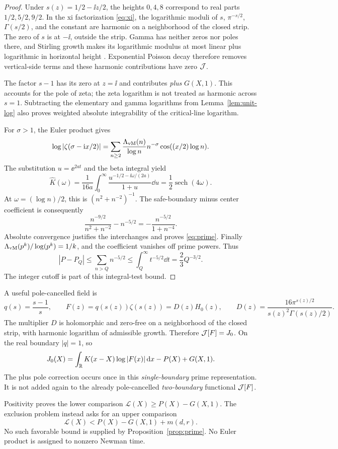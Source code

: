 \begin{proof}
Under \(s(z)=1/2-\ii z/2\), the heights \(0,4,8\) correspond to
real parts \(1/2,5/2,9/2\). In the xi factorization
\eqref{eq:xi}, the logarithmic moduli of \(s\), \(\pi^{-s/2}\),
\(\Gamma(s/2)\), and the constant are harmonic on a neighborhood
of the closed strip. The zero of \(s\) is at \(-\ii\), outside
the strip. Gamma has neither zeros nor poles there, and Stirling
growth makes its logarithmic modulus at most linear plus logarithmic
in horizontal height \cite{DLMFGreenPrime}. Exponential Poisson
decay therefore removes vertical-side terms and these harmonic
contributions have zero \(\mathcal J\).

The factor \(s-1\) has its zero at \(z=\ii\) and contributes
\emph{plus} \(G(X,1)\). This accounts for the pole of zeta; the
zeta logarithm is not treated as harmonic across \(s=1\).
Subtracting the elementary and gamma logarithms from
Lemma~\ref{lem:unit-log} also proves weighted absolute integrability
of the critical-line logarithm.

For \(\sigma>1\), the Euler product gives
\[
 \log|\zeta(\sigma-\mathrm i x/2)|
 =\sum_{n\ge2}\frac{\Lambda_{\rm vM}(n)}{\log n}
       n^{-\sigma}\cos((x/2)\log n).
\]
The substitution \(u=\ee^{2at}\) and the beta integral yield
\[
 \widehat K(\omega)
 =\frac1{16a}\int_0^\infty
       \frac{u^{-1/2-\ii\omega/(2a)}}{1+u}\dd u
 =\frac12\operatorname{sech}(4\omega).
\]
At \(\omega=(\log n)/2\), this is \((n^2+n^{-2})^{-1}\).
The safe-boundary minus center coefficient is consequently
\[
 \frac{n^{-9/2}}{n^2+n^{-2}}-n^{-5/2}
 =-\frac{n^{-5/2}}{1+n^{-4}}.
\]
Absolute convergence justifies the interchanges and proves
\eqref{eq:prime}. Finally
\(\Lambda_{\rm vM}(p^k)/\log(p^k)=1/k\), and the coefficient
vanishes off prime powers. Thus
\[
 |P-P_Q|\le\sum_{n>Q}n^{-5/2}
          \le\int_Q^\infty t^{-5/2}\dd t=\frac23Q^{-3/2}.
\]
The integer cutoff is part of this integral-test bound.
\end{proof}

A useful pole-cancelled field is
\begin{equation}\label{eq:F}
 q(s)=\frac{s-1}{s},\qquad
 F(z)=q(s(z))\zeta(s(z))=D(z)H_0(z),\qquad
 D(z)=\frac{16\pi^{s(z)/2}}{s(z)^2\Gamma(s(z)/2)}.
\end{equation}
The multiplier \(D\) is holomorphic and zero-free on a neighborhood
of the closed strip, with harmonic logarithm of admissible growth.
Therefore \(\mathcal J[F]=J_0\). On the real boundary \(|q|=1\), so
\begin{equation}\label{eq:F-prime}
 J_0(X)=\int_\mathbb R K(x-X)\log|F(x)|\,\mathrm d x-P(X)+G(X,1).
\end{equation}
The plus pole correction occurs once in this \emph{single-boundary}
prime representation. It is not added again to the already
pole-cancelled \emph{two-boundary} functional \(\mathcal J[F]\).

Positivity proves the lower comparison
\(\mathcal L(X)\ge P(X)-G(X,1)\).
The exclusion problem instead asks for an upper comparison
\[
 \mathcal L(X)<P(X)-G(X,1)+m(d,r).
\]
No such favorable bound is supplied by Proposition~\ref{prop:prime}.
No Euler product is assigned to nonzero Newman time.

